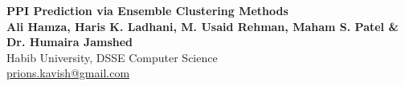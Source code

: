 \documentclass[a0, landscape]{a0poster}
\begin{document}



\begin{minipage}[b]{1\linewidth}
\veryHuge \color{NavyBlue} \textbf{PPI Prediction via Ensemble Clustering Methods} \color{Black}\\ %
\huge \textbf{Ali Hamza, Haris K. Ladhani, M. Usaid Rehman, Maham S. Patel \& Dr. Humaira Jamshed}\\ %
\huge Habib University, DSSE Computer Science\\ %
\Large \href{mailto:prions.kavish@gmail.com}{prions.kavish@gmail.com}\\ %

\end{minipage}
%
%
\vspace{1cm} %

\end{document}
